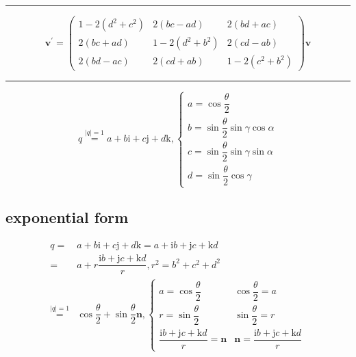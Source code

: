 \documentclass[
]{book}
\theoremstyle{definition}
\theoremstyle{definition}
\theoremstyle{definition}
\theoremstyle{definition}
\theoremstyle{remark}
\begin{document}
\begin{center}\rule{0.5\linewidth}{0.5pt}\end{center}

\[
\boldsymbol{v}^{\prime}=\begin{pmatrix}1-2\left(d^{2}+c^{2}\right) & 2\left(bc-ad\right) & 2\left(bd+ac\right)\\
2\left(bc+ad\right) & 1-2\left(d^{2}+b^{2}\right) & 2\left(cd-ab\right)\\
2\left(bd-ac\right) & 2\left(cd+ab\right) & 1-2\left(c^{2}+b^{2}\right)
\end{pmatrix}\boldsymbol{v}
\]

\begin{center}\rule{0.5\linewidth}{0.5pt}\end{center}

\[
q\overset{\left|q\right|=1}{=}a+b\mathrm{i}+c\mathrm{j}+d\mathrm{k},\begin{cases}
a=\cos\dfrac{\theta}{2}\\
b=\sin\dfrac{\theta}{2}\sin\gamma\cos\alpha\\
c=\sin\dfrac{\theta}{2}\sin\gamma\sin\alpha\\
d=\sin\dfrac{\theta}{2}\cos\gamma
\end{cases}
\]

\hypertarget{exponential-form}{%
\subsection{exponential form}\label{exponential-form}}

\[
\begin{aligned}
q= & a+b\mathrm{i}+c\mathrm{j}+d\mathrm{k}=a+\mathrm{i}b+\mathrm{j}c+\mathrm{k}d\\
= & a+r\dfrac{\mathrm{i}b+\mathrm{j}c+\mathrm{k}d}{r},r^{2}=b^{2}+c^{2}+d^{2}\\
\overset{\left|q\right|=1}{=} & \cos\dfrac{\theta}{2}+\sin\dfrac{\theta}{2}\boldsymbol{n},\begin{cases}
a=\cos\dfrac{\theta}{2} & \cos\dfrac{\theta}{2}=a\\
r=\sin\dfrac{\theta}{2} & \sin\dfrac{\theta}{2}=r\\
\dfrac{\mathrm{i}b+\mathrm{j}c+\mathrm{k}d}{r}=\boldsymbol{n} & \boldsymbol{n}=\dfrac{\mathrm{i}b+\mathrm{j}c+\mathrm{k}d}{r}
\end{cases}
\end{aligned}
\]
\end{document}
